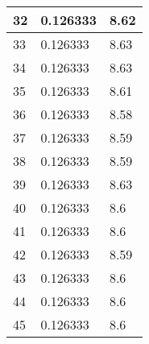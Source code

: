 \begin{table}
\begin{tabular}{ | l | l | l |}
    32 & 0.126333 & 8.62 \\ \hline
    33 & 0.126333 & 8.63 \\ \hline
    34 & 0.126333 & 8.63 \\ \hline
    35 & 0.126333 & 8.61 \\ \hline
    36 & 0.126333 & 8.58 \\ \hline
    37 & 0.126333 & 8.59 \\ \hline
    38 & 0.126333 & 8.59 \\ \hline
    39 & 0.126333 & 8.63 \\ \hline
    40 & 0.126333 & 8.6 \\ \hline
    41 & 0.126333 & 8.6 \\ \hline
    42 & 0.126333 & 8.59 \\ \hline
    43 & 0.126333 & 8.6 \\ \hline
    44 & 0.126333 & 8.6 \\ \hline
    45 & 0.126333 & 8.6 \\ \hline
    \end{tabular}
\label{table:GPU first test}
\end{table}
\bigskip

